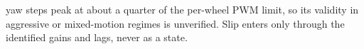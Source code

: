yaw steps peak at about a quarter of the per-wheel PWM limit, so its validity
in aggressive or mixed-motion regimes is unverified. Slip enters only through
the identified gains and lags, never as a state.

